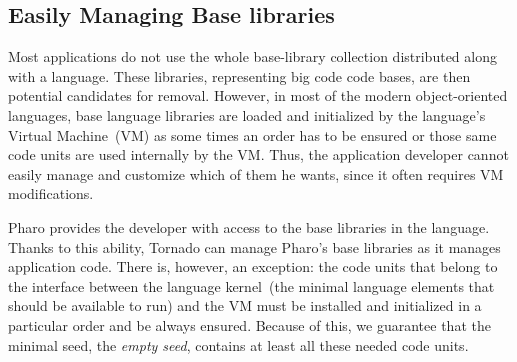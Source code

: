 %


\subsection{Easily Managing Base libraries} Most applications do not use the whole base-library collection distributed along with a language. These libraries, representing big code code bases, are then potential candidates for removal. However, in most of the modern object-oriented languages, base language libraries are loaded and initialized by the language's Virtual Machine~(VM) as some times an order has to be ensured or those same code units are used internally by the VM. Thus, the application developer cannot easily manage and customize which of them he wants, since it often requires VM modifications.

Pharo provides the developer with access to the base libraries in the language. Thanks to this ability, Tornado can manage Pharo's base libraries as it manages application code. There is, however, an exception: the code units that belong to the interface between the language kernel~(\ie the minimal language elements that should be available to run) and the VM must be installed and initialized in a particular order and be always ensured. Because of this, we guarantee that the minimal seed, the \emph{empty seed}, contains at least all these needed code units.

